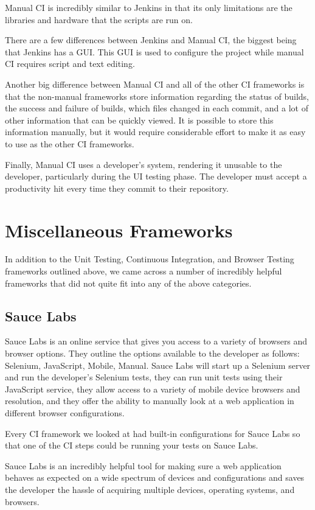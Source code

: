 \documentclass[12pt]{ucthesis}
\begin{document}
Manual CI is incredibly similar to Jenkins in that its only limitations are the libraries and hardware that the scripts are run on.

There are a few differences between Jenkins and Manual CI, the biggest being that Jenkins has a GUI. This GUI is used to configure the project while manual CI requires script and text editing. 

Another big difference between Manual CI and all of the other CI frameworks is that the non-manual frameworks store information regarding the status of builds, the success and failure of builds, which files changed in each commit, and a lot of other information that can be quickly viewed. It is possible to store this information manually, but it would require considerable effort to make it as easy to use as the other CI frameworks.

Finally, Manual CI uses a developer's system, rendering it unusable to the developer, particularly during the UI testing phase. The developer must accept a productivity hit every time they commit to their repository.

\section{Miscellaneous Frameworks}
In addition to the Unit Testing, Continuous Integration, and Browser Testing frameworks outlined above, we came across a number of incredibly helpful frameworks that did not quite fit into any of the above categories.

\subsection{Sauce Labs}
Sauce Labs\cite{SauceLabs} is an online service that gives you access to a variety of browsers and browser options. They outline the options available to the developer as follows: Selenium, JavaScript, Mobile, Manual. Sauce Labs will start up a Selenium server and run the developer's Selenium tests, they can run unit tests using their JavaScript service, they allow access to a variety of mobile device browsers and resolution, and they offer the ability to manually look at a web application in different browser configurations.

Every CI framework we looked at had built-in configurations for Sauce Labs so that one of the CI steps could be running your tests on Sauce Labs.

Sauce Labs is an incredibly helpful tool for making sure a web application behaves as expected on a wide spectrum of devices and configurations and saves the developer the hassle of acquiring multiple devices, operating systems, and browsers.
\end{document}

